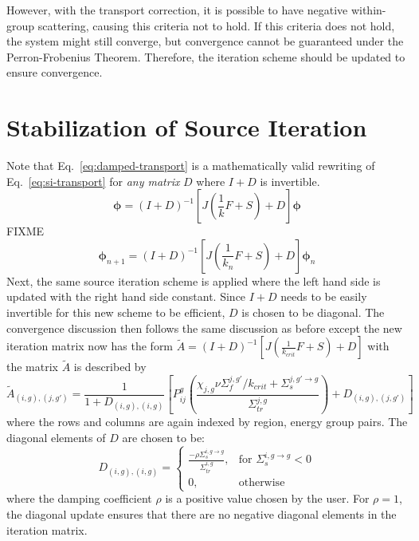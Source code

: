 However, with the transport correction, it is possible to have negative within-group scattering, causing this criteria not to hold. If this criteria does not hold, the system might still converge, but convergence cannot be guaranteed under the Perron-Frobenius Theorem. Therefore, the iteration scheme should be updated to ensure convergence. 

\section{Stabilization of Source Iteration}
\label{sec:diagonal-stabilization}

Note that Eq.~\ref{eq:damped-transport} is a mathematically valid rewriting of Eq.~\ref{eq:si-transport} for \textit{any matrix} $D$ where $I+D$ is invertible. 
\begin{equation}
	\boldsymbol{\phi} = (I+D)^{-1} \left[J \left(\frac{1}{k} F + S \right) + D \right]\boldsymbol{\phi}
	\label{eq:damped-transport}
\end{equation}
FIXME
\begin{equation}
	\boldsymbol{\phi}_{n+1} = (I+D)^{-1} \left[J \left(\frac{1}{k_n} F + S \right) + D \right]\boldsymbol{\phi}_n
\end{equation}
Next, the same source iteration scheme is applied where the left hand side is updated with the right hand side constant. Since $I+D$ needs to be easily invertible for this new scheme to be efficient, $D$ is chosen to be diagonal. The convergence discussion then follows the same discussion as before except the new iteration matrix  now has the form $\tilde{A} = (I+D)^{-1} \left[ J \left(\frac{1}{k_{\textit{crit}}} F + S \right) + D \right]$  with the matrix $\tilde{A}$ is described by
\begin{equation}
	\tilde{A}_{(i,g), (j, g')} = \frac{1}{1 + D_{(i,g), (i,g)}}\left[P_{ij}^g \left(\frac{\chi_{j,g} \nu\Sigma_{f}^{j,g'} / k_{\textit{crit}} + \Sigma_{s}^{j,g' \rightarrow g}}{\Sigma_{\textit{tr}}^{j, g}}\right) + D_{(i,g), (j, g')}\right]
	\label{eq:a-tilde}
\end{equation}
where the rows and columns are again indexed by region, energy group pairs. The diagonal elements of $D$ are chosen to be:
\begin{equation}
	D_{(i,g), (i,g)} = \left\{\begin{array}{lr}
		\frac{-\rho \Sigma_{s}^{i,g \rightarrow g}}{\Sigma_{\textit{tr}}^{i, g}} , & \text{for } \Sigma_{s}^{i, g \rightarrow g} < 0\\
		0, & \text{otherwise}
	\end{array}\right.
	\label{eq:d-matrix}
\end{equation}
where the damping coefficient $\rho$ is a positive value chosen by the user. For $\rho = 1$, the diagonal update ensures that there are no negative diagonal elements in the iteration matrix. 

